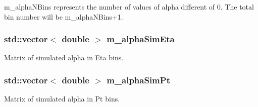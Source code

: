 m\+\_\+alpha\+N\+Bins represents the number of values of alpha different of 0. The total bin number will be m\+\_\+alpha\+N\+Bins+1. \hypertarget{classTemplateMethod_1_1Setting_a094383216ce9e24f79a0f37512f9eb1f}{
\subsubsection[{m\+\_\+alpha\+Sim\+Eta}]{\setlength{\rightskip}{0pt plus 5cm}std\+::vector$<$ double $>$ m\+\_\+alpha\+Sim\+Eta\hspace{0.3cm}{\ttfamily [private]}}}\label{classTemplateMethod_1_1Setting_a094383216ce9e24f79a0f37512f9eb1f}


Matrix of simulated alpha in Eta bins. 

\hypertarget{classTemplateMethod_1_1Setting_ac97c81e2517538c077a42837e29fd1d6}{
\subsubsection[{m\+\_\+alpha\+Sim\+Pt}]{\setlength{\rightskip}{0pt plus 5cm}std\+::vector$<$ double $>$ m\+\_\+alpha\+Sim\+Pt\hspace{0.3cm}{\ttfamily [private]}}}\label{classTemplateMethod_1_1Setting_ac97c81e2517538c077a42837e29fd1d6}


Matrix of simulated alpha in Pt bins. 


